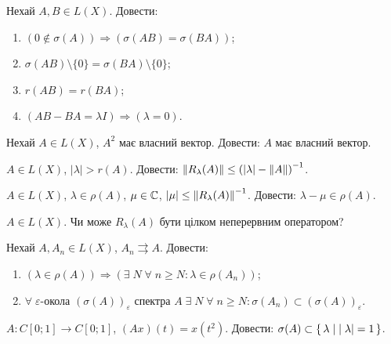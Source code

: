 \begin{exercise}
    Нехай $A, B \in L(X)$. Довести:
    \begin{enumerate}
        \item $\left( 0 \notin \sigma(A)\right) \Rightarrow \left( \sigma(AB) = \sigma(BA)\right)$;
        \item $\sigma(AB) \setminus \{ 0 \} = \sigma(BA) \setminus \{ 0 \}$;
        \item $r(AB) = r(BA)$;
        \item $\left( AB - BA = \lambda I \right) \Rightarrow \left( \lambda = 0\right)$.
    \end{enumerate}
\end{exercise}

\begin{exercise}
    Нехай $A \in L(X)$, $A^2$ має власний вектор. Довести: $A$ має власний вектор.
\end{exercise}

\begin{exercise}
    $A \in L(X)$, $| \lambda | > r(A)$. 
    Довести: $\left\lVert R_\lambda (A)\right\rVert \leq \left( | \lambda | - \left\lVert A\right\rVert\right)^{-1}$.
\end{exercise}

\begin{exercise}
    $A \in L(X)$, $\lambda \in \rho (A)$, $\mu \in \mathbb{C}$, $|\mu| \leq \left\lVert R_\lambda (A)\right\rVert^{-1}$.
    Довести: $\lambda - \mu \in \rho (A)$.
\end{exercise}

\begin{exercise}
    $A \in L(X)$. Чи може $R_\lambda (A)$ бути цілком неперервним оператором?
\end{exercise}

\begin{exercise}
    Нехай $A, A_n \in L(X)$, $A_n \rightrightarrows A$. Довести:
    \begin{enumerate}
        \item $\left( \lambda \in \rho(A) \right) \Rightarrow \left( \exists \; N \; \forall \; n \geq N : \lambda \in \rho(A_n) \right)$;
        \item $\forall \; \varepsilon\text{-окола } (\sigma(A))_\varepsilon \text{ спектра } A \; \exists \; N \; \forall \; n \geq N : \sigma(A_n) \subset (\sigma(A))_\varepsilon $.
    \end{enumerate}
\end{exercise}

\begin{exercise}
    $A : C[0;1] \to C[0;1]$, $(Ax)(t) = x(t^2)$. Довести: $\sigma(A) \subset \set{\lambda \mid |\lambda| = 1}$.
\end{exercise}

